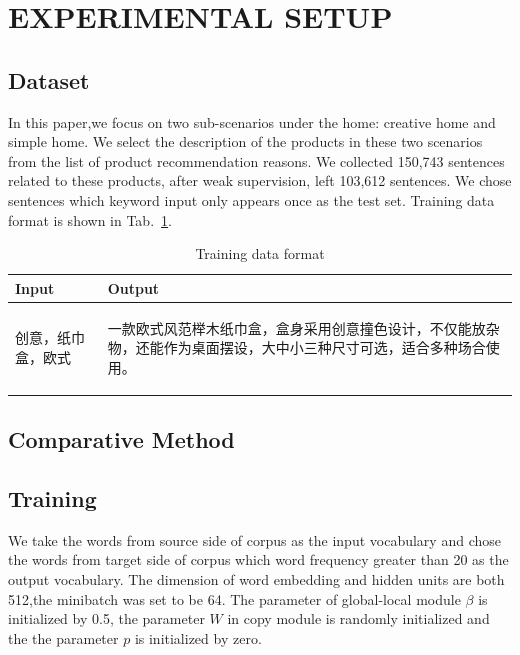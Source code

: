 \documentclass[sigconf]{acmart}
\begin{document}
\section{EXPERIMENTAL SETUP}\label{sec:experiment}
\subsection{Dataset}
In this paper,we focus on two sub-scenarios under the home: creative home and simple home. We select the description of the products in these two scenarios from the list of product recommendation reasons. We collected 150,743 sentences related to these products, after weak supervision, left 103,612 sentences. We chose sentences which keyword input only appears once as the test set. Training data format is shown in Tab.~\ref{table:format}. 

\begin{table}
\caption{Training data format }\label{table:format}
\begin{center}
\begin{tabular}{p{2.5cm}p{5cm}}
    \toprule
    Input & Output \\
    \midrule
    \begin{CJK*}{UTF8}{gbsn}
        创意，纸巾盒，欧式
    \end{CJK*} &
    \begin{CJK*}{UTF8}{gbsn}
        一款欧式风范榉木纸巾盒，盒身采用创意撞色设计，不仅能放杂物，还能作为桌面摆设，大中小三种尺寸可选，适合多种场合使用。
    \end{CJK*} \\
    \bottomrule
\end{tabular}
\end{center}
\end{table}

\subsection{Comparative Method}

\subsection{Training}
We take the words from source side of corpus as the input vocabulary and chose the words from target side of corpus which word frequency greater than 20 as the output vocabulary. The dimension of word embedding and hidden units are both 512,the minibatch was set to be 64. The parameter of global-local module $\beta$ is initialized by 0.5, the parameter $W$ in copy module is randomly initialized and the the parameter $p$ is initialized by zero.
\end{document}
